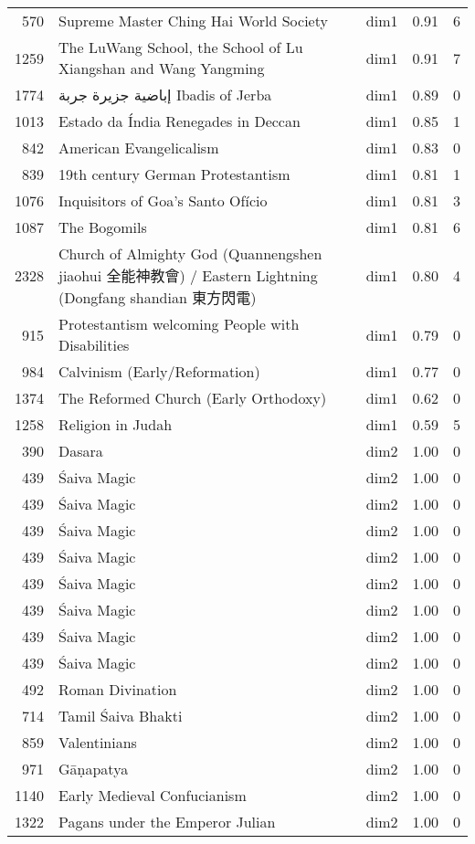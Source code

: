 \begin{tabular}{rllrr}
570 & Supreme Master Ching Hai World Society & dim1 & 0.91 & 6 \\
1259 & The LuWang School, the School of Lu Xiangshan and Wang Yangming & dim1 & 0.91 & 7 \\
1774 & إباضية جزيرة جربة Ibadis of Jerba & dim1 & 0.89 & 0 \\
1013 & Estado da Índia Renegades in Deccan & dim1 & 0.85 & 1 \\
842 & American Evangelicalism & dim1 & 0.83 & 0 \\
839 & 19th century German Protestantism & dim1 & 0.81 & 1 \\
1076 & Inquisitors of Goa's Santo Ofício & dim1 & 0.81 & 3 \\
1087 & The Bogomils & dim1 & 0.81 & 6 \\
2328 & Church of Almighty God (Quannengshen jiaohui 全能神教會) / Eastern Lightning (Dongfang shandian 東方閃電) & dim1 & 0.80 & 4 \\
915 & Protestantism welcoming People with Disabilities & dim1 & 0.79 & 0 \\
984 & Calvinism (Early/Reformation) & dim1 & 0.77 & 0 \\
1374 & The Reformed Church (Early Orthodoxy) & dim1 & 0.62 & 0 \\
1258 & Religion in Judah & dim1 & 0.59 & 5 \\
390 & Dasara & dim2 & 1.00 & 0 \\
439 & Śaiva Magic & dim2 & 1.00 & 0 \\
439 & Śaiva Magic & dim2 & 1.00 & 0 \\
439 & Śaiva Magic & dim2 & 1.00 & 0 \\
439 & Śaiva Magic & dim2 & 1.00 & 0 \\
439 & Śaiva Magic & dim2 & 1.00 & 0 \\
439 & Śaiva Magic & dim2 & 1.00 & 0 \\
439 & Śaiva Magic & dim2 & 1.00 & 0 \\
439 & Śaiva Magic & dim2 & 1.00 & 0 \\
492 & Roman Divination & dim2 & 1.00 & 0 \\
714 & Tamil Śaiva Bhakti & dim2 & 1.00 & 0 \\
859 & Valentinians & dim2 & 1.00 & 0 \\
971 & Gāṇapatya & dim2 & 1.00 & 0 \\
1140 & Early Medieval Confucianism & dim2 & 1.00 & 0 \\
1322 & Pagans under the Emperor Julian & dim2 & 1.00 & 0 \\

\end{tabular}
